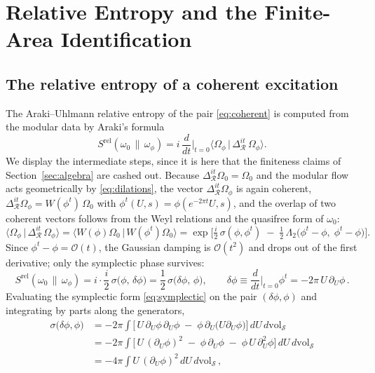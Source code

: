 \documentclass[11pt]{article}
\newcommand{\Srel}{S^{\mathrm{rel}}}
\begin{document}
\section{Relative Entropy and the Finite-Area Identification}
\label{sec:entropy}

\subsection{The relative entropy of a coherent excitation}

The Araki--Uhlmann relative entropy of the pair \eqref{eq:coherent} is computed from the modular data by Araki's formula
\begin{equation}
\Srel(\omega_0\,\|\,\omega_\phi)
= i\,\frac{d}{dt}\Big|_{t=0} \big\langle \Omega_\phi \,\big|\, \Delta_{\mathcal{R}}^{it}\, \Omega_\phi \big\rangle .
\label{eq:araki-formula}
\end{equation}
We display the intermediate steps, since it is here that the finiteness claims of Section~\ref{sec:algebra} are cashed out. Because $\Delta^{it}_{\mathcal{R}} \Omega_0 = \Omega_0$ and the modular flow acts geometrically by \eqref{eq:dilations}, the vector $\Delta_{\mathcal{R}}^{it}\Omega_\phi$ is again coherent, $\Delta_{\mathcal{R}}^{it} \Omega_\phi = W(\phi^t)\,\Omega_0$ with $\phi^t(U,s) = \phi(e^{-2\pi t} U, s)$, and the overlap of two coherent vectors follows from the Weyl relations and the quasifree form of $\omega_0$:
\begin{equation}
\big\langle \Omega_\phi \,\big|\, \Delta_{\mathcal{R}}^{it}\, \Omega_\phi \big\rangle
= \big\langle W(\phi)\Omega_0 \,\big|\, W(\phi^t)\Omega_0 \big\rangle
= \exp\!\Big[ \tfrac{i}{2}\,\sigma(\phi, \phi^t) \;-\; \tfrac{1}{2}\, \Lambda_2\big(\phi^t - \phi,\; \phi^t - \phi\big) \Big].
\label{eq:overlap}
\end{equation}
Since $\phi^t - \phi = \mathcal{O}(t)$, the Gaussian damping is $\mathcal{O}(t^2)$ and drops out of the first derivative; only the symplectic phase survives:
\begin{equation}
\Srel(\omega_0\,\|\,\omega_\phi)
= i \cdot \frac{i}{2}\,\sigma\big(\phi,\, \delta\phi\big)
= \frac{1}{2}\,\sigma\big(\delta\phi,\, \phi\big),
\qquad
\delta\phi \equiv \frac{d}{dt}\Big|_{t=0} \phi^t = -2\pi\, U\, \partial_U \phi\,.
\label{eq:Srel-symplectic}
\end{equation}
Evaluating the symplectic form \eqref{eq:symplectic} on the pair $(\delta\phi, \phi)$ and integrating by parts along the generators,
\begin{align}
\sigma\big(\delta\phi, \phi\big)
&= -2\pi \int \Big[\, U\,\partial_U\phi \,\partial_U \phi \;-\; \phi\, \partial_U\big(U \partial_U \phi\big) \Big]\, dU\, d\mathrm{vol}_{\mathcal{S}}
\nonumber\\[2pt]
&= -2\pi \int \Big[\, U\,(\partial_U\phi)^2 \;-\; \phi\,\partial_U\phi \;-\; \phi\, U\, \partial_U^2 \phi \Big]\, dU\, d\mathrm{vol}_{\mathcal{S}}
\nonumber\\[2pt]
&= -4\pi \int U\,(\partial_U\phi)^2 \, dU\, d\mathrm{vol}_{\mathcal{S}}\,,
\label{eq:byparts}
\end{align}
\end{document}
